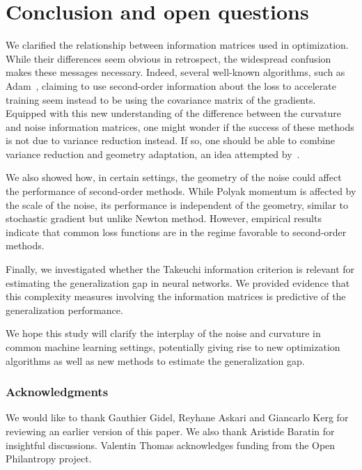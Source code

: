 \section{Conclusion and open questions}
We clarified the relationship between information matrices used in optimization. While their differences seem obvious in retrospect, the widespread confusion makes these messages necessary. Indeed, several well-known algorithms, such as Adam~\citep{kingma2014adam}, claiming to use second-order information about the loss to accelerate training seem instead to be using the covariance matrix of the gradients. Equipped with this new understanding of the difference between the curvature and noise information matrices, one might wonder if the success of these methods is not due to variance reduction instead. If so, one should be able to combine variance reduction and geometry adaptation, an idea attempted by~\citet{leroux2011}.

We also showed how, in certain settings, the geometry of the noise could affect the performance of second-order methods. While Polyak momentum is affected by the scale of the noise, its performance is independent of the geometry, similar to stochastic gradient but unlike Newton method. However, empirical results indicate that common loss functions are in the regime favorable to second-order methods.

Finally, we investigated whether the Takeuchi information criterion is relevant for estimating the generalization gap in neural networks. We provided evidence that this complexity measures involving the information matrices is predictive of the generalization performance.

We hope this study will clarify the interplay of the noise and curvature in common machine learning settings, potentially giving rise to new optimization algorithms as well as new methods to estimate the generalization gap.

\subsubsection*{Acknowledgments}
We would like to thank Gauthier Gidel, Reyhane Askari and Giancarlo Kerg for reviewing an earlier version of this paper. We also thank Aristide Baratin for insightful discussions.
Valentin Thomas acknowledges funding from the Open Philantropy project.





